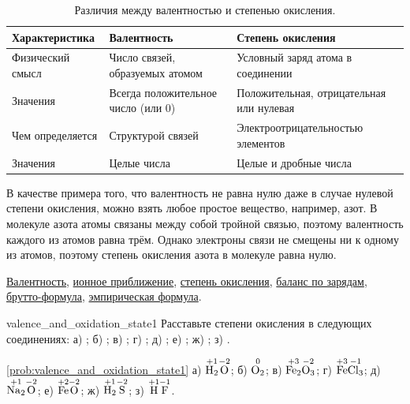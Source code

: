 \begin{table}[htbp]
    \small
    \caption{Различия между валентностью и степенью окисления.}
    \label{tab:difference_between_valence_and_oxidation_state}
    \begin{tabularx}{\textwidth}{
        >{\hsize}Y
        >{\hsize}Y
        >{\hsize}Y
        }
        \hline
        Характеристика & Валентность & Степень окисления \\
        \hline
        Физический смысл & Число связей, образуемых атомом & Условный заряд атома в соединении \\
        \hline
        Значения & Всегда положительное число (или 0) & Положительная, отрицательная или нулевая \\
        \hline
        Чем определяется & Структурой связей & Электроотрицательностью элементов \\
        \hline
        Значения & Целые числа & Целые и дробные числа \\
        \hline
    \end{tabularx}
\end{table}

В качестве примера того, что валентность не равна нулю даже в случае нулевой степени окисления, можно взять любое простое вещество, например, азот. В молекуле азота  атомы связаны между собой тройной связью, поэтому валентность каждого из атомов равна трём. Однако электроны связи не смещены ни к одному из атомов, поэтому степень окисления азота в молекуле  равна нулю.

\begin{termlist}
    \hyperref[term:valence]{Валентность},
    \hyperref[term:ionic_approximation]{ионное приближение},
    \hyperref[term:oxidation_state]{степень окисления},
    \hyperref[term:charge_balance]{баланс по зарядам},
    \hyperref[term:molecular_formula]{брутто-формула},
    \hyperref[term:empirical_formula]{эмпирическая формула}.
\end{termlist}

\begin{problem}{}{valence_and_oxidation_state1}
    Расставьте степени окисления в следующих соединениях: а) ; б) ; в) ; г) ; д) ; е) ; ж) ; з) .
    \begin{sol}{\ref{prob:valence_and_oxidation_state1}}
        а) $\overset{+1}{\ce{H2}}\overset{-2}{\ce{O}}$; б) $\overset{0}{\ce{O2}}$; в) $\overset{+3}{\ce{Fe2}}\overset{-2}{\ce{O3}}$; г) $\overset{+3}{\ce{Fe}}\overset{-1}{\ce{Cl3}}$; д) $\overset{+1}{\ce{Na2}}\overset{-2}{\ce{O}}$; е) $\overset{+2}{\ce{Fe}}\overset{-2}{\ce{O}}$; ж) $\overset{+1}{\ce{H2}}\overset{-2}{\ce{S}}$; з) $\overset{+1}{\ce{H}}\overset{-1}{\ce{F}}$.
    \end{sol}
\end{problem}

